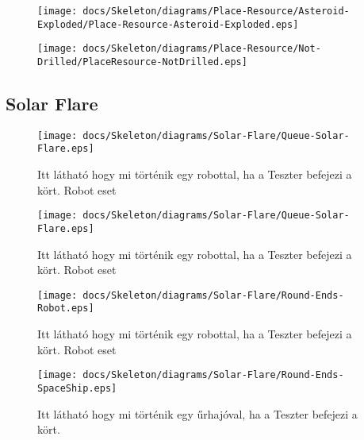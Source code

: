 \begin{figure}[H] 
    \centering 
    \texttt{[image: docs/Skeleton/diagrams/Place-Resource/Asteroid-Exploded/Place-Resource-Asteroid-Exploded.eps]} 
    \caption{} 
\end{figure} 

\begin{figure}[H] 
    \centering 
    \texttt{[image: docs/Skeleton/diagrams/Place-Resource/Not-Drilled/PlaceResource-NotDrilled.eps]} 
    \caption{} 
\end{figure} 



\subsection{Solar Flare}

\begin{figure}[H] 
    \centering 
    \texttt{[image: docs/Skeleton/diagrams/Solar-Flare/Queue-Solar-Flare.eps]} 
    \caption{Itt látható hogy mi történik egy robottal, ha a Teszter befejezi a kört. Robot eset} 
\end{figure}

\begin{figure}[H] 
    \centering 
    \texttt{[image: docs/Skeleton/diagrams/Solar-Flare/Queue-Solar-Flare.eps]} 
    \caption{Itt látható hogy mi történik egy robottal, ha a Teszter befejezi a kört. Robot eset} 
\end{figure}

\begin{figure}[H] 
    \centering 
    \texttt{[image: docs/Skeleton/diagrams/Solar-Flare/Round-Ends-Robot.eps]} 
    \caption{Itt látható hogy mi történik egy robottal, ha a Teszter befejezi a kört. Robot eset} 
\end{figure}

\begin{figure}[H] 
    \centering 
    \texttt{[image: docs/Skeleton/diagrams/Solar-Flare/Round-Ends-SpaceShip.eps]} 
    \caption{Itt látható hogy mi történik egy űrhajóval, ha a Teszter befejezi a kört.} 
\end{figure}


